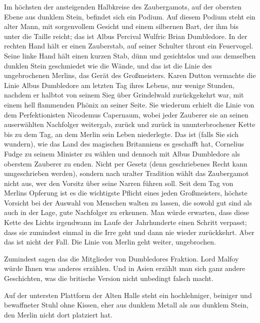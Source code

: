 Im höchsten der ansteigenden Halbkreise des Zaubergamots, auf der obersten Ebene aus dunklem Stein, befindet sich ein Podium. Auf diesem Podium steht ein alter Mann, mit sorgenvollem Gesicht und einem silbernen Bart, der ihm bis unter die Taille reicht; das ist Albus Percival Wulfric Brian Dumbledore. In der rechten Hand hält er einen Zauberstab, auf seiner Schulter thront ein Feuervogel. Seine linke Hand hält einen kurzen Stab, dünn und gesichtslos und aus demselben dunklen Stein geschmiedet wie die Wände, und das ist die Linie des ungebrochenen Merlins, das Gerät des Großmeisters. Karen Dutton vermachte die Linie Albus Dumbledore am letzten Tag ihres Lebens, nur wenige Stunden, nachdem er halbtot von seinem Sieg über Grindelwald zurückgekehrt war, mit einem hell flammenden Phönix an seiner Seite. Sie wiederum erhielt die Linie von dem Perfektionisten Nicodemus Capernaum, wobei jeder Zauberer sie an seinen auserwählten Nachfolger weitergab, zurück und zurück in ununterbrochener Kette bis zu dem Tag, an dem Merlin sein Leben niederlegte. Das ist (falls Sie sich wundern), wie das Land des magischen Britanniens es geschafft hat, Cornelius Fudge zu seinem Minister zu wählen und dennoch mit Albus Dumbledore als oberstem Zauberer zu enden. Nicht per Gesetz (denn geschriebenes Recht kann umgeschrieben werden), sondern nach uralter Tradition wählt das Zaubergamot nicht aus, wer den Vorsitz über seine Narren führen soll. Seit dem Tag von Merlins Opferung ist es die wichtigste Pflicht eines jeden Großmeisters, höchste Vorsicht bei der Auswahl von Menschen walten zu lassen, die sowohl gut sind als auch in der Lage, gute Nachfolger zu erkennen. Man würde erwarten, dass diese Kette des Lichts irgendwann im Laufe der Jahrhunderte einen Schritt verpasst; dass sie zumindest einmal in die Irre geht und dann nie wieder zurückkehrt. Aber das ist nicht der Fall. Die Linie von Merlin geht weiter, ungebrochen.

Zumindest sagen das die Mitglieder von Dumbledores Fraktion. Lord Malfoy würde Ihnen was anderes erzählen. Und in Asien erzählt man sich ganz andere Geschichten, was die britische Version nicht unbedingt falsch macht.

Auf der untersten Plattform der Alten Halle steht ein hochlehniger, beiniger und bewaffneter Stuhl ohne Kissen, eher aus dunklem Metall als aus dunklem Stein, den Merlin nicht dort platziert hat.

